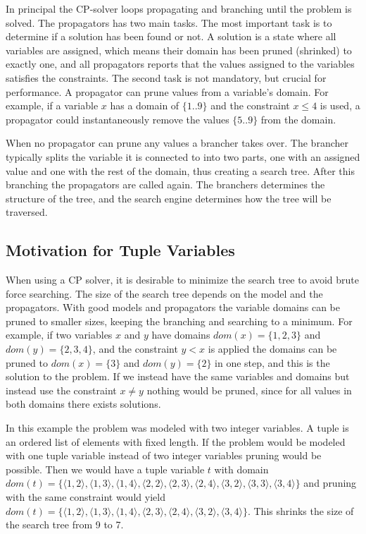 \documentclass[a4paper,11pt]{article}
\begin{document}
In principal the CP-solver loops propagating and branching until the problem is solved. The propagators has two main tasks. The most important task is to determine if a solution has been found or not. A solution is a state where all variables are assigned, which means their domain has been pruned (shrinked) to exactly one, and all propagators reports that the values assigned to the variables satisfies the constraints. The second task is not mandatory, but crucial for performance. A propagator can prune values from a variable's domain. For example, if a variable $x$ has a domain of $\{1..9\}$ and the constraint $x\le 4$ is used, a propagator could instantaneously remove the values $\{5..9\}$ from the domain.

When no propagator can prune any values a brancher takes over. The brancher typically splits the variable it is connected to into two parts, one with an assigned value and one with the rest of the domain, thus creating a search tree. After this branching the propagators are called again. The branchers determines the structure of the tree, and the search engine determines how the tree will be traversed. 

\subsection{Motivation for Tuple Variables}
When using a CP solver, it is desirable to minimize the search tree to avoid brute force searching. The size of the search tree depends on the model and the propagators. With good models and propagators the variable domains can be pruned to smaller sizes, keeping the branching and searching to a minimum. For example, if two variables $x$ and $y$ have domains $dom(x)=\{1,2,3\}$ and $dom(y)=\{2,3,4\}$, and the constraint $y<x$ is applied the domains can be pruned to $dom(x)=\{3\}$ and $dom(y)=\{2\}$ in one step, and this is the solution to the problem. If we instead have the same variables and domains but instead use the constraint $x\neq y$ nothing would be pruned, since for all values in both domains there exists solutions. 

In this example the problem was modeled with two integer variables. A tuple is an ordered list of elements with fixed length. If the problem would be modeled with one tuple variable instead of two integer variables pruning would be possible. Then we would have a tuple variable $t$ with domain $dom(t)=\{\langle1,2\rangle,\langle1,3\rangle,\langle1,4\rangle,\langle2,2\rangle,\langle2,3\rangle,\langle2,4\rangle,\langle3,2\rangle,\langle3,3\rangle,\langle3,4\rangle\}$ and pruning with the same constraint would yield $dom(t)=\{\langle1,2\rangle,\langle1,3\rangle,\langle1,4\rangle,\langle2,3\rangle,\langle2,4\rangle,\langle3,2\rangle,\langle3,4\rangle\}$. This shrinks the size of the search tree from 9 to 7. 
\end{document}

